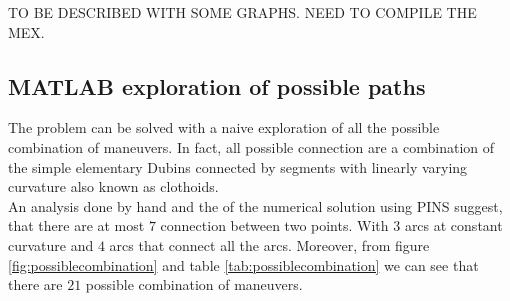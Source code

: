 \documentclass[11pt,twocolumn]{scrartcl}
\begin{document}
TO BE DESCRIBED WITH SOME GRAPHS. NEED TO COMPILE THE MEX.

\subsection*{MATLAB exploration of possible paths}

The problem can be solved with a naive exploration of all the possible combination of maneuvers. In fact, all possible connection are a combination of the simple elementary Dubins connected by segments with linearly varying curvature also known as clothoids.\cite{bertolazzi2015g1}\\
An analysis done by hand and the of the numerical solution using PINS suggest, that there are at most $7$ connection between two points. With $3$ arcs at constant curvature and $4$ arcs that connect all the arcs. Moreover, from figure \ref{fig:possiblecombination} and table \ref{tab:possiblecombination} we can see that there are $21$ possible combination of maneuvers.\\





%

%



 
\end{document}
